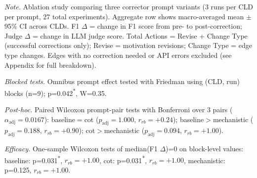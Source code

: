 \begin{table}[H]
\centering
\begin{minipage}{\linewidth}
\centering
\caption{Corrector Prompt Ablation on Synthetic Corruptions: Performance Comparison}
\label{tab:rq1b_prompt_ablation_synthetic}
\begin{threeparttable}
\end{threeparttable}
\vspace{0.5em}
\footnotesize
\textit{Note.} Ablation study comparing three corrector prompt variants (3 runs per CLD per prompt, 27 total experiments). 
Aggregate row shows macro-averaged mean $\pm$ 95\% CI across CLDs.
F1 $\Delta$ = change in F1 score from pre- to post-correction; Judge $\Delta$ = change in LLM judge score.
Total Actions = Revise + Change Type (successful corrections only); Revise = motivation revisions; Change Type = edge type changes.
Edges with no correction needed or API errors excluded (see Appendix for full breakdown).\par
\textit{Blocked tests.} Omnibus prompt effect tested with Friedman using (CLD, run) blocks (n=9); p=0.042\textsuperscript{*}, W=0.35.\par
\textit{Post-hoc.} Paired Wilcoxon prompt-pair tests with Bonferroni over 3 pairs ($\alpha_{\text{adj}}=0.0167$): baseline$=$cot ($p_{\text{adj}}=1.000$, $r_{rb}=+0.24$); baseline$>$mechanistic ($p_{\text{adj}}=0.188$, $r_{rb}=+0.90$); cot$>$mechanistic ($p_{\text{adj}}=0.094$, $r_{rb}=+1.00$).\par
\textit{Efficacy.} One-sample Wilcoxon tests of median(F1 $\Delta$)=0 on block-level values: baseline: p=0.031\textsuperscript{*}, $r_{rb}=+1.00$, cot: p=0.031\textsuperscript{*}, $r_{rb}=+1.00$, mechanistic: p=0.125, $r_{rb}=+1.00$.

\end{minipage}
\end{table}
